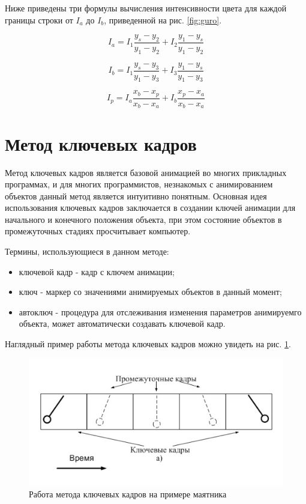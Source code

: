 \vspace{0.3cm}Ниже приведены три формулы вычисления интенсивности цвета для каждой границы строки от $I_a$ до $I_b$, приведенной на рис. \ref{fig:guro}.

\begin{equation}
I_a = I_1\frac{y_s-y_2}{y_1-y_2} + I_2\frac{y_1-y_s}{y_1-y_2}
\end{equation}

\begin{equation}
I_b = I_1\frac{y_s-y_3}{y_1-y_3} + I_3\frac{y_1-y_s}{y_1-y_3}
\end{equation}

\begin{equation}
I_p = I_a\frac{x_b-x_p}{x_b-x_a} + I_b\frac{x_p-x_a}{x_b-x_a}
\end{equation}

\section{Метод ключевых кадров}
\hspace{0.6cm}Метод ключевых кадров является базовой анимацией во многих прикладных программах, и для многих программистов, незнакомых с анимированием объектов данный метод является интуитивно понятным. Основная идея использования ключевых кадров заключается в создании ключей анимации для начального и конечного положения объекта, при этом состояние объектов в промежуточных стадиях просчитывает компьютер.

\vspace{0.3cm}Термины, использующиеся в данном методе:
\begin{itemize}
	\item ключевой кадр - кадр с ключем анимации;
	\item ключ - маркер со значениями анимируемых объектов в данный момент;
	\item автоключ - процедура для отслеживания изменения параметров анимируемго объекта, может автоматически создавать ключевой кадр.
\end{itemize}

Наглядный пример работы метода ключевых кадров можно увидеть на рис. \ref{fig:keyframe}\cite{web:keyframe}.

\begin{figure}[ht!]
	\centering
	\includegraphics[scale=0.7]{keyframe}
	\caption{Работа метода ключевых кадров на примере маятника}
	\label{fig:keyframe}
\end{figure}

